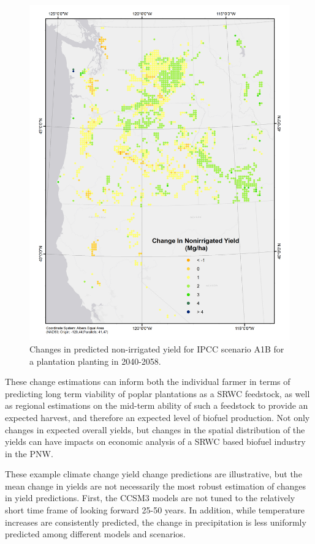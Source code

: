 \documentclass[preprint,review,12pt]{elsarticle}
\begin{document}
\begin{figure}[hp]
  \centering
  \includegraphics[width=1\linewidth]{climate_nonirrigated}
  \caption{Changes in predicted non-irrigated yield for \ac{IPCC} scenario A1B
    for a plantation planting in 2040-2058.}
  \label{fig:new_nonirrigated}
\end{figure}

These change estimations can inform both the individual farmer in terms of
predicting long term viability of poplar plantations as a \ac{SRWC}
feedstock, as well as regional estimations on the mid-term ability of
such a feedstock to provide an expected harvest, and therefore an
expected level of biofuel production.  Not only changes in expected
overall yields, but changes in the spatial distribution of the yields
can have impacts on economic analysis of a \ac{SRWC} based biofuel
industry in the \ac{PNW}.  

These example climate change yield change predictions are
illustrative, but the mean change in yields are not necessarily the
most robust estimation of changes in yield predictions.  First, the
\ac{CCSM3} models are not tuned to the relatively short time frame of
looking forward 25-50 years.  In addition, while temperature increases
are consistently predicted, the change in precipitation is less
uniformly predicted among different models and scenarios. 
\end{document}
